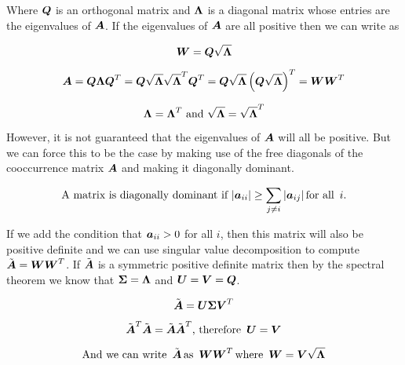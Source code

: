 \documentclass{article}
\begin{document}
Where $\boldsymbol{Q}$ is an orthogonal matrix and $\boldsymbol{\Lambda}$ is a diagonal matrix whose entries are the eigenvalues of $\boldsymbol{A}$. If the eigenvalues of $\boldsymbol{A}$ are all positive then we can write as

\begin{equation*}
\boldsymbol{W} = \boldsymbol{Q} \sqrt{\boldsymbol{\Lambda}}
\end{equation*}

\begin{equation*}
\boldsymbol{A} = \boldsymbol{Q}\boldsymbol{\Lambda}\boldsymbol{Q}^T =  \boldsymbol{Q} \sqrt{\boldsymbol{\Lambda}} \sqrt{\boldsymbol{\Lambda}}^T \boldsymbol{Q}^T = \boldsymbol{Q} \sqrt{\boldsymbol{\Lambda}} \left( \boldsymbol{Q} \sqrt{\boldsymbol{\Lambda}} \right)^T = \boldsymbol{W}\boldsymbol{W}^T
\end{equation*}

\begin{equation*}
\text{$\boldsymbol{\Lambda} = \boldsymbol{\Lambda}^T$ and $\sqrt{\boldsymbol{\Lambda}} = \sqrt{\boldsymbol{\Lambda}}^T$}
\end{equation*}

However, it is not guaranteed that the eigenvalues of $\boldsymbol{A}$ will all be positive. But we can force this to be the case by making use of the free diagonals of the cooccurrence matrix $\boldsymbol{A}$ and making it diagonally dominant.

\begin{equation*}
\text{A matrix is diagonally dominant if }
\lvert \boldsymbol{a}_{ii} \rvert \geq \sum_{j \neq i}{\lvert \boldsymbol{a}_{ij} \rvert} \, \text{for all } \, i \text{.}
\end{equation*}

If we add the condition that $\boldsymbol{a}_{ii} > 0$ for all $i$, then this matrix will also be positive definite and we can use singular value decomposition to compute $\tilde{\boldsymbol{A}} = \boldsymbol{W}\boldsymbol{W}^T$. If $\tilde{\boldsymbol{A}}$ is a symmetric positive definite matrix then by the spectral theorem we know that $\boldsymbol{\Sigma} = \boldsymbol{\Lambda}$ and $\boldsymbol{U} = \boldsymbol{V} = \boldsymbol{Q}$.


\begin{equation*}
\tilde{\boldsymbol{A}} = \boldsymbol{U}\boldsymbol{\Sigma}\boldsymbol{V}^T
\end{equation*}

\begin{equation*}
\tilde{\boldsymbol{A}}^T\tilde{\boldsymbol{A}} = \tilde{\boldsymbol{A}}\tilde{\boldsymbol{A}}^T  \text{, therefore } \, \boldsymbol{U} = \boldsymbol{V}
\end{equation*}


\begin{equation*}
\text{And we can write } \, \tilde{\boldsymbol{A}} \, \text{as } \, \boldsymbol{W}\boldsymbol{W}^T \, \text{where } \, \boldsymbol{W} = \boldsymbol{V} \sqrt{\boldsymbol{\Lambda}}
\end{equation*}
\end{document}
